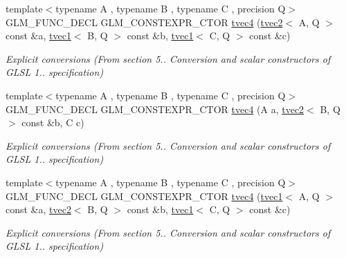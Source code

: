 \begin{DoxyCompactItemize}
\mbox{\label{structglm_1_1tvec4_a51f1f037c1b0ddc5cf7b610c6efda7f7}} 
{\footnotesize template$<$typename A , typename B , typename C , precision Q$>$ }\\G\+L\+M\+\_\+\+F\+U\+N\+C\+\_\+\+D\+E\+CL G\+L\+M\+\_\+\+C\+O\+N\+S\+T\+E\+X\+P\+R\+\_\+\+C\+T\+OR \hyperlink{structglm_1_1tvec4_a51f1f037c1b0ddc5cf7b610c6efda7f7}{tvec4} (\hyperlink{structglm_1_1tvec2}{tvec2}$<$ A, Q $>$ const \&a, \hyperlink{structglm_1_1tvec1}{tvec1}$<$ B, Q $>$ const \&b, \hyperlink{structglm_1_1tvec1}{tvec1}$<$ C, Q $>$ const \&c)
\begin{DoxyCompactList}\small\item\em Explicit conversions (From section 5.. Conversion and scalar constructors of G\+L\+SL 1.. specification) \end{DoxyCompactList}\item 
\mbox{\label{structglm_1_1tvec4_a9a93a56b36b84497626d62d7095e8180}} 
{\footnotesize template$<$typename A , typename B , typename C , precision Q$>$ }\\G\+L\+M\+\_\+\+F\+U\+N\+C\+\_\+\+D\+E\+CL G\+L\+M\+\_\+\+C\+O\+N\+S\+T\+E\+X\+P\+R\+\_\+\+C\+T\+OR \hyperlink{structglm_1_1tvec4_a9a93a56b36b84497626d62d7095e8180}{tvec4} (A a, \hyperlink{structglm_1_1tvec2}{tvec2}$<$ B, Q $>$ const \&b, C c)
\begin{DoxyCompactList}\small\item\em Explicit conversions (From section 5.. Conversion and scalar constructors of G\+L\+SL 1.. specification) \end{DoxyCompactList}\item 
\mbox{\label{structglm_1_1tvec4_a7eca60159dda77cc975ad39b0e2cf5dc}} 
{\footnotesize template$<$typename A , typename B , typename C , precision Q$>$ }\\G\+L\+M\+\_\+\+F\+U\+N\+C\+\_\+\+D\+E\+CL G\+L\+M\+\_\+\+C\+O\+N\+S\+T\+E\+X\+P\+R\+\_\+\+C\+T\+OR \hyperlink{structglm_1_1tvec4_a7eca60159dda77cc975ad39b0e2cf5dc}{tvec4} (\hyperlink{structglm_1_1tvec1}{tvec1}$<$ A, Q $>$ const \&a, \hyperlink{structglm_1_1tvec2}{tvec2}$<$ B, Q $>$ const \&b, \hyperlink{structglm_1_1tvec1}{tvec1}$<$ C, Q $>$ const \&c)
\begin{DoxyCompactList}\small\item\em Explicit conversions (From section 5.. Conversion and scalar constructors of G\+L\+SL 1.. specification) \end{DoxyCompactList}\item 

\end{DoxyCompactItemize}
